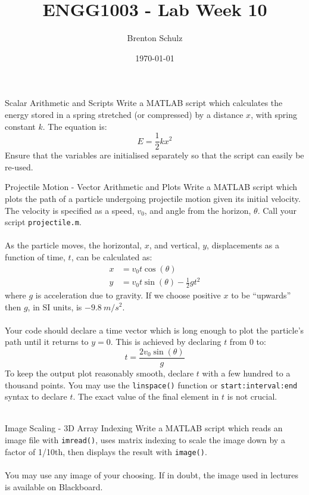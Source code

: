 \documentclass{lab}
\title{ENGG1003 - Lab Week 10}
\author{Brenton Schulz}
\date{\today}
\begin{document}
\maketitle

\begin{task}{Scalar Arithmetic and Scripts}{}
Write a MATLAB script which calculates the energy stored in a spring stretched (or compressed) by a distance $x$, with spring constant $k$. The equation is:
\begin{equation*}
E = \frac{1}{2}k x^2
\end{equation*}
Ensure that the variables are initialised separately so that the script can easily be re-used.
\end{task}

\begin{task}{Projectile Motion - Vector Arithmetic and Plots}{}
Write a MATLAB script which plots the path of a particle undergoing projectile motion given its initial velocity. The velocity is specified as a speed, $v_0$, and angle from the horizon, $\theta$. Call your script \texttt{projectile.m}.
\\~\\
As the particle moves, the horizontal, $x$, and vertical, $y$, displacements as a function of time, $t$, can be calculated as:
\begin{align*}
x &= v_0 t \cos(\theta) \\
y &= v_0 t \sin(\theta) - \frac{1}{2}g t^2
\end{align*}
where $g$ is acceleration due to gravity. If we choose positive $x$ to be ``upwards'' then $g$, in SI units, is $-9.8~{m/s^2}$.
\\~\\
Your code should declare a time vector which is long enough to plot the particle's path until it returns to $y=0$. This is achieved by declaring $t$ from 0 to:
\begin{equation*}
t = \frac{2 v_0 \sin(\theta)}{g}
\end{equation*}
To keep the output plot reasonably smooth, declare $t$ with a few hundred to a thousand points. You may use the \texttt{linspace()} function or \texttt{start:interval:end} syntax to declare $t$. The exact value of the final element in $t$ is not crucial.
\\~\\
\end{task}

\begin{task}{Image Scaling - 3D Array Indexing}{}
Write a MATLAB script which reads an image file with \texttt{imread()}, uses matrix indexing to scale the image down by a factor of 1/10th, then displays the result with \texttt{image()}.
\\~\\
You may use any image of your choosing. If in doubt, the image used in lectures is available on Blackboard.
\end{task}
\end{document}
